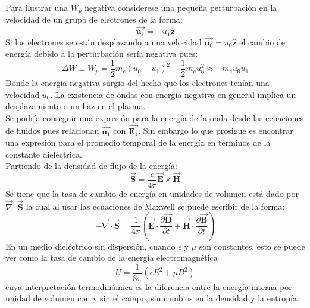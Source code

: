 \documentclass[../tesis_main_file.tex]{subfiles}
\begin{document}
Para ilustrar una $W_p$ negativa considerese una pequeña perturbación en la velocidad de un grupo de electrones de la forma:
\begin{equation}
\overrightarrow{\textbf{u}_1}=-u_1\widehat{\textbf{z}}
\end{equation}
Si los electrones se están desplazando a una velocidad $\overrightarrow{\textbf{u}_0}=u_0\widehat{\textbf{z}}$ el cambio de energía debido a la perturbación sería negativa pues:
\begin{equation}
\Delta W \equiv W_p = \frac{1}{2}m_e(u_0-u_1)^2-\frac{1}{2}m_eu_0^2\approx-m_eu_0u_1
\end{equation}
Donde la energía negativa surgio del hecho que los electrones tenían una velocidad $u_0$. La existencia de ondas con energía negativa en general implica un desplazamiento o un haz en el plasma.\\
Se podría conseguir una expresión para la energía de la onda desde las ecuaciones de fluidos pues relacionan $\overrightarrow{\textbf{u}_1}$ con $\overrightarrow{\textbf{E}_1}$. Sin embargo lo que prosigue es encontrar una expresión para el promedio temporal de la energía en términos de la constante dieléctrica.\\
Partiendo de la densidad de flujo de la energía:
\begin{equation}
\overrightarrow{\textbf{S}}= \frac{c}{4 \pi}\overrightarrow{\textbf{E}}\times \overrightarrow{\textbf{H}}
\end{equation}
Se tiene que la tasa de cambio de energía en unidades de volumen está dado por $\overrightarrow{\nabla} \cdot \overrightarrow{\textbf{S}}$ la cual al usar las ecuaciones de Maxwell se puede escribir de la forma:
\begin{equation}
\label{eq:tasa_cambio_energia_em_por_volumen}
-\overrightarrow{\nabla} \cdot \overrightarrow{\textbf{S}}= \frac{1}{4 \pi}\left(\overrightarrow{\textbf{E}}\cdot \frac{\partial \overrightarrow{\textbf{D}}}{\partial t} + \overrightarrow{\textbf{H}}\cdot \frac{\partial \overrightarrow{\textbf{B}}}{\partial t} \right)
\end{equation}
En un medio dieléctrico sin dispersión, cuando $\epsilon$ y $\mu$ son constantes, esto se puede ver como la tasa de cambio de la energía electromagnética
\begin{equation}
U = \frac{1}{8\pi}\left(\epsilon E^2 +\mu B^2\right)
\end{equation}
cuya interpretación termodinámica es la diferencia entre la energía interna por unidad de volumen con y sin el campo, sin cambios en la densidad y la entropía. \cite{Landau1690Electro_media}\\
\end{document}
